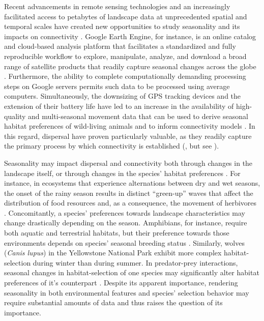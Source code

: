 \documentclass[abstract=on,10pt,a4paper,bibliography=totocnumbered]{article}
\begin{document}
Recent advancements in remote sensing technologies and an increasingly
facilitated access to petabytes of landscape data at unprecedented spatial and
temporal scales have created new opportunities to study seasonality and its
impacts on connectivity \citep{Toth.2016, Rumiano.2020}. Google Earth Engine,
for instance, is an online catalog and cloud-based analysis platform that
facilitates a standardized and fully reproducible workflow to explore,
manipulate, analyze, and download a broad range of satellite products that
readily capture seasonal changes across the globe \citep{Zhao.2021}.
Furthermore, the ability to complete computationally demanding processing steps
on Google servers permits such data to be processed using average computers.
Simultaneously, the downsizing of GPS tracking devices and the extension of
their battery life have led to an increase in the availability of high-quality
and multi-seasonal movement data \citep{Cagnacci.2010, Kays.2015} that can be
used to derive seasonal habitat preferences of wild-living animals
\citep{Fortin.2005, Manly.2007, Cushman.2010} and to inform connectivity models
\citep{Diniz.2019}. In this regard, dispersal have proven particularly valuable,
as they readily capture the primary process by which connectivity is established
(\citealp{Elliot.2014, Vasudev.2015}, but see \citealp{Fattebert.2015}).

Seasonality may impact dispersal and connectivity both through changes in the
landscape itself, or through changes in the species' habitat preferences
\citep{Mui.2017}. For instance, in ecosystems that experience alternations
between dry and wet seasons, the onset of the rainy season results in distinct
``green-up'' waves that affect the distribution of food resources and, as a
consequence, the movement of herbivores \citep{Merkle.2016}. Concomitantly, a
species' preferences towards landscape characteristics may change drastically
depending on the season. Amphibians, for instance, require both aquatic and
terrestrial habitats, but their preference towards those environments depends on
species' seasonal breeding status \citep{Baldwin.2006}. Similarly, wolves
(\textit{Canis lupus}) in the Yellowstone National Park exhibit more complex
habitat-selection during winter than during summer. In predator-prey
interactions, seasonal changes in habitat-selection of one species may
significantly alter habitat preferences of it's counterpart
\citep{Grenier-Potvin.2021}. Despite its apparent importance, rendering
seasonality in both environmental features and species' selection behavior may
require substantial amounts of data and thus raises the question of its
importance.
\end{document}
